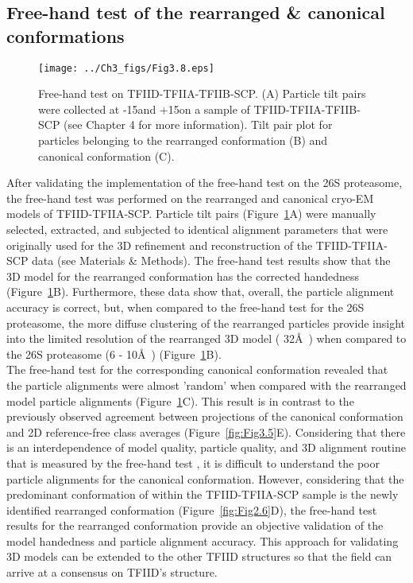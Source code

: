 \subsection{Free-hand test of the rearranged \& canonical conformations}
\begin{figure}
\centering
\texttt{[image: ../Ch3\_figs/Fig3.8.eps]}
\caption[Free-hand test on TFIID-TFIIA-TFIIB-SCP]{Free-hand test on TFIID-TFIIA-TFIIB-SCP. (A) Particle tilt pairs were collected at -15\textdegree and +15\textdegree on a sample of TFIID-TFIIA-TFIIB-SCP (see Chapter 4 for more information). Tilt pair plot for particles belonging to the rearranged conformation (B) and canonical conformation (C). }
\label{fig:Fig3.8}
\end{figure}
After validating the implementation of the free-hand test on the 26S proteasome, the free-hand test was performed on the rearranged and canonical cryo-EM models of TFIID-TFIIA-SCP. Particle tilt pairs (Figure~\ref{fig:Fig3.8}A) were manually selected, extracted, and subjected to identical alignment parameters that were originally used for the 3D refinement and reconstruction of the TFIID-TFIIA-SCP data (see Materials \& Methods). The free-hand test results show that the 3D model for the rearranged conformation has the corrected handedness (Figure~\ref{fig:Fig3.8}B). Furthermore, these data show that, overall, the particle alignment accuracy is correct, but, when compared to the free-hand test for the 26S proteasome, the more diffuse clustering of the rearranged particles provide insight into the limited resolution of the rearranged 3D model ( 32\AA\ ) when compared to the 26S proteasome (6 - 10\AA\ ) (Figure~\ref{fig:Fig3.8}B).\\ 
\indent The free-hand test for the corresponding canonical conformation revealed that the particle alignments were almost 'random' when compared with the rearranged model particle alignments (Figure~\ref{fig:Fig3.8}C). This result is in contrast to the previously observed agreement between projections of the canonical conformation and 2D reference-free class averages (Figure~\ref{fig:Fig3.5}E). Considering that there is an interdependence of model quality, particle quality, and 3D alignment routine that is measured by the free-hand test \cite{Baker_2012,Henderson_2011,Lau_2010}, it is difficult to understand the poor particle alignments for the canonical conformation. However, considering that the predominant conformation of within the TFIID-TFIIA-SCP sample is the newly identified rearranged conformation (Figure~\ref{fig:Fig2.6}D), the free-hand test results for the rearranged conformation provide an objective validation of the model handedness and particle alignment accuracy. This approach for validating 3D models can be extended to the other TFIID structures  \cite{Elmlund_691,Leurent_1797,Leurent_1554,Papai_539,Papai_418} so that the field can arrive at a consensus on TFIID's structure.  
  
